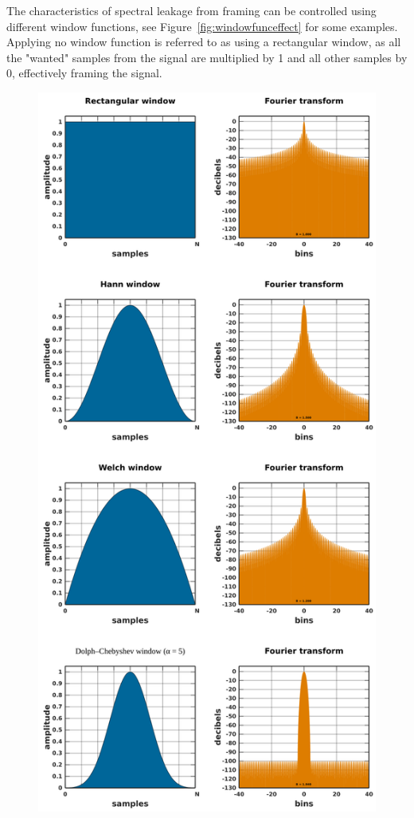 \documentclass[a4paper,10pt,twocolumn]{article}
\begin{document}
The characteristics of spectral leakage from framing can be controlled using different window functions, see Figure~\ref{fig:windowfunceffect} for some examples. Applying no window function is referred to as using a rectangular window, as all the "wanted" samples from the signal are multiplied by 1 and all other samples by 0, effectively framing the signal.
\begin{figure}[b!]
    \centering
    \includegraphics[width=0.92\linewidth]{fig/windows.png}

\end{figure}
\end{document}
